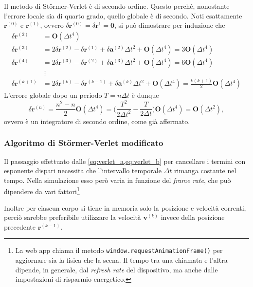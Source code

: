 \documentclass[11pt]{article}
\begin{document}
	Il metodo di Störmer-Verlet è di secondo ordine. Questo perché, nonostante l'errore locale sia di quarto grado, quello globale è di secondo. Noti esattamente $\mathbf{r}^{(0)}$ e $\mathbf{r}^{(1)}$, ovvero $\delta\mathbf{r}^{(0)} = \delta\mathbf{r}^{1} = \mathbf{0}$, si può dimostrare per induzione che 
	\begin{align*}
		\delta \mathbf{r}^{(2)} &= \mathbf{O}(\Delta t^4) \\
		\delta \mathbf{r}^{(3)} &= 2\delta\mathbf{r}^{(2)} - \delta\mathbf{r}^{(1)} + \delta\mathbf{a}^{(2)}\Delta t^2 + \mathbf{O}(\Delta t^4) = 3\mathbf{O}(\Delta t^4) \\
		\delta \mathbf{r}^{(4)} &= 2\delta\mathbf{r}^{(3)} - \delta\mathbf{r}^{(2)} + \delta\mathbf{a}^{(3)}\Delta t^2 + \mathbf{O}(\Delta t^4) = 6\mathbf{O}(\Delta t^4) \\
		&\:\vdots \\[-2ex]
		\delta\mathbf{r}^{(k + 1)} &= 2\delta\mathbf{r}^{(k)} - \delta\mathbf{r}^{(k - 1)} + \delta\mathbf{a}^{(k)}\Delta t^2 + \mathbf{O}(\Delta t^4) = \frac{k(k + 1)}{2}\mathbf{O}(\Delta t^4)
	\end{align*}
	L'errore globale dopo un periodo $T = n\Delta t$ è dunque 
	\begin{equation*}
		\delta\mathbf{r}^{(n)} = \frac{n^2 - n}{2}\mathbf{O}(\Delta t^4) = \biggl(\frac{T^2}{2\Delta t^2} - \frac{T}{2\Delta t}\biggr)\mathbf{O}(\Delta t^4) = \mathbf{O}(\Delta t^2),
	\end{equation*}
	ovvero è un integratore di secondo ordine, come già affermato.

	\subsubsection{Algoritmo di Störmer-Verlet modificato}

	Il passaggio effettuato dalle \cref{eq:verlet_a,eq:verlet_b} per cancellare i termini con esponente dispari necessita che l'intervallo temporale $\Delta t$ rimanga costante nel tempo. Nella simulazione esso però varia in funzione del \emph{frame rate}, che può dipendere da vari fattori\footnote{La web app chiama il metodo \texttt{window.requestAnimationFrame()} per aggiornare sia la fisica che la scena. Il tempo tra una chiamata e l'altra dipende, in generale, dal \emph{refresh rate} del dispositivo, ma anche dalle impostazioni di risparmio energetico\cite{RequestAnimationFrame}.}

	Inoltre per ciascun corpo si tiene in memoria solo la posizione e velocità correnti, perciò sarebbe preferibile utilizzare la velocità $\mathbf{v}^{(k)}$ invece della posizione precedente $\mathbf{r}^{(k - 1)}$. 
\end{document}
